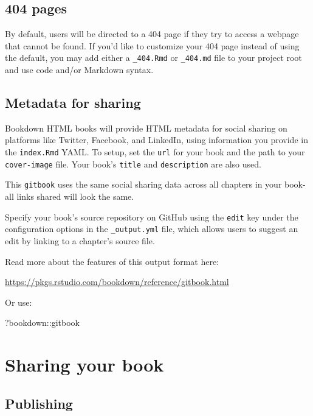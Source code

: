 \documentclass[
]{book}
\newenvironment{Shaded}{\begin{snugshade}}{\end{snugshade}}
\newcommand{\NormalTok}[1]{#1}
\newcommand{\SpecialCharTok}[1]{\textcolor[rgb]{0.00,0.00,0.00}{#1}}
\begin{document}
\hypertarget{pages}{%
\section{404 pages}\label{pages}}

By default, users will be directed to a 404 page if they try to access a webpage that cannot be found. If you'd like to customize your 404 page instead of using the default, you may add either a \texttt{\_404.Rmd} or \texttt{\_404.md} file to your project root and use code and/or Markdown syntax.

\hypertarget{metadata-for-sharing}{%
\section{Metadata for sharing}\label{metadata-for-sharing}}

Bookdown HTML books will provide HTML metadata for social sharing on platforms like Twitter, Facebook, and LinkedIn, using information you provide in the \texttt{index.Rmd} YAML. To setup, set the \texttt{url} for your book and the path to your \texttt{cover-image} file. Your book's \texttt{title} and \texttt{description} are also used.

This \texttt{gitbook} uses the same social sharing data across all chapters in your book- all links shared will look the same.

Specify your book's source repository on GitHub using the \texttt{edit} key under the configuration options in the \texttt{\_output.yml} file, which allows users to suggest an edit by linking to a chapter's source file.

Read more about the features of this output format here:

\url{https://pkgs.rstudio.com/bookdown/reference/gitbook.html}

Or use:

\begin{Shaded}
\begin{Highlighting}[]
\NormalTok{?bookdown}\SpecialCharTok{::}\NormalTok{gitbook}
\end{Highlighting}
\end{Shaded}

\hypertarget{sharing-your-book-1}{%
\chapter{Sharing your book}\label{sharing-your-book-1}}

\hypertarget{publishing-1}{%
\section{Publishing}\label{publishing-1}}
\end{document}
